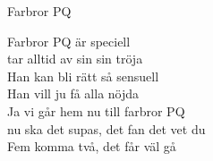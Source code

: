 {\Large Farbror PQ}
\begin{vers}
Farbror PQ är speciell\\
tar alltid av sin sin tröja\\
Han kan bli rätt så sensuell\\
Han vill ju få alla nöjda\\
Ja vi går hem nu till farbror PQ\\
nu ska det supas, det fan det vet du\\
Fem komma två, det får väl gå
\end{vers}